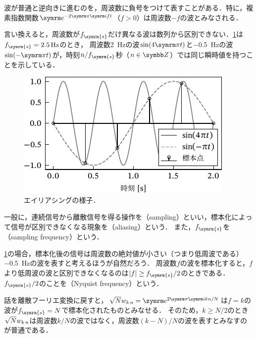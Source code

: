 \documentclass[../../main]{subfiles}
\begin{document}
\begin{note}
  波が普通と逆向きに進むのを，周波数に負号をつけて表すことがある．特に，複素指数関数\(\napr^{-2\krez\iuni ft}\)（\(f>0\)）は周波数\(-f\)の波とみなされる．
\end{note}

言い換えると，周波数が\(f_{\symrm{s}}\)だけ異なる波は数列から区別できない．\cref{figure:aliasing}は\(f_{\symrm{s}}=\SI{2.5}{Hz}\)のとき，
周波数\SI{2}{Hz}の波\(\sin(4\krez t)\)と\SI{-0.5}{Hz}の波\(\sin(-\krez t)\)が，時刻\(n/f_{\symrm{s}}\)秒（\(n\in\numset{Z}\)）では同じ瞬時値を持つことを示している．

\begin{figure}[htbp]
  \centering
  \includegraphics{figures/aliasing.pdf}
  \caption{エイリアシングの様子．}
  \label{figure:aliasing}
\end{figure}

一般に，連続信号から離散信号を得る操作を（sampling）といい，標本化によって信号が区別できなくなる現象を（aliasing）という．
また，\(f_{\symrm{s}}\)を（sampling frequency）という．

\cref{figure:aliasing}の場合，標本化後の信号は周波数の絶対値が小さい（つまり低周波である）\SI{-0.5}{Hz}の波を表すと考えるほうが自然だろう．
周波数\(f\)の波を標本化すると，\(f\)より低周波の波と区別できなくなるのは\(\abs{f}\geq f_{\symrm{s}}/2\)のときである．\(f_{\symrm{s}}/2\)のことを（Nyquist frequency）という．

話を離散フーリエ変換に戻すと，\(\sqrt{N}\midx{w}{k}{n}=\napr^{2\krez\iuni kn/N}\)は\(f=k\)の波が\(f_{\symrm{s}}=N\)で標本化されたものとみなせる．
そのため，\(k\geq N/2\)のとき\(\sqrt{N}w_{k\,n}\)は周波数\(k/N\)の波ではなく，周波数\((k-N)/N\)の波を表すとみなすのが普通である．
\end{document}
